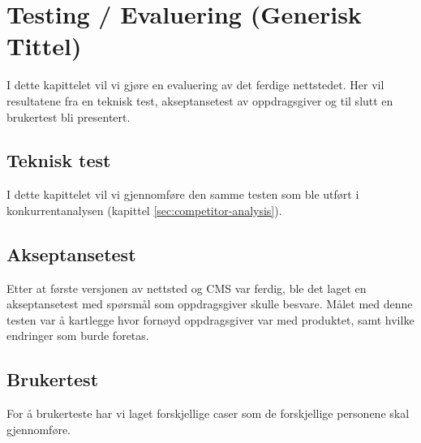 \cleardoublepage
\chapter{Testing / Evaluering (Generisk Tittel)}
\label{chap:evaluation} 


I dette kapittelet vil vi gjøre en evaluering av det ferdige nettstedet. Her vil resultatene fra en teknisk test, akseptansetest av oppdragsgiver og til slutt en brukertest bli presentert.

\section{Teknisk test}
I dette kapittelet vil vi gjennomføre den samme testen som ble utført i konkurrentanalysen (kapittel \ref{sec:competitor-analysis}).

\section{Akseptansetest}
Etter at første versjonen av nettsted og CMS var ferdig, ble det laget en akseptansetest med spørsmål som oppdragsgiver skulle besvare. Målet med denne testen var å kartlegge hvor fornøyd oppdragsgiver var med produktet, samt hvilke endringer som burde foretas. 

\section{Brukertest}
For å brukerteste har vi laget forskjellige caser som de forskjellige personene skal gjennomføre.

